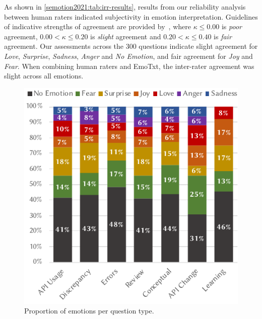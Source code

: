 As shown in \cref{semotion2021:tab:irr-results}, results from our reliability analysis between human raters indicated subjectivity in emotion interpretation. Guidelines of indicative strengths of agreement are provided by~\citet{Landis:1977kv}, where $\kappa \leq 0.00$ is \textit{poor} agreement, $0.00 < \kappa \leq 0.20$ is \textit{slight} agreement and $0.20 < \kappa \leq 0.40$ is \textit{fair} agreement. Our assessments across the 300 questions indicate slight agreement for \textit{Love}, \textit{Surprise}, \textit{Sadness}, \textit{Anger} and \textit{No Emotion}, and fair agreement for \textit{Joy} and \textit{Fear}. When combining human raters and EmoTxt, the inter-rater agreement was slight across all emotions.  

\begin{figure}[t!]
\centering
\includegraphics[width=.6\linewidth]{emotionproportion}
\caption[Proportions of emotions per question type]{Proportion of emotions per question type.}
\label{semotion2021:fig:emotion-dist}
\end{figure}


